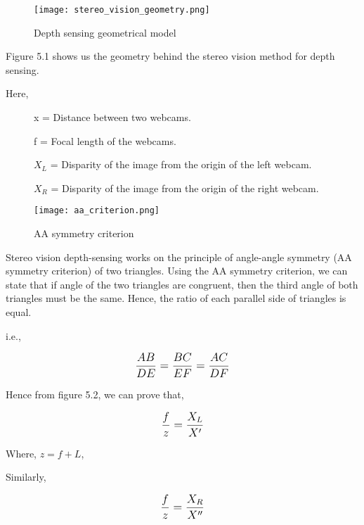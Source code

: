 \documentclass[../../hardware_design_intro/hardware_design_intro.tex]{subfiles}
\begin{document}
\FloatBarrier

\begin{figure}[ht]
    \centering
    \texttt{[image: stereo\_vision\_geometry.png]}
    \caption{Depth sensing geometrical model}
\end{figure}

\FloatBarrier

Figure 5.1 shows us the geometry behind the stereo vision method for depth sensing.

Here, 

\begin{description}
    \item[]x = Distance between two webcams. 
    \item[]f = Focal length of the webcams.
    \item[]\(X_{L}\) = Disparity of the image from the origin of the left webcam.
    \item[]\(X_{R}\) = Disparity of the image from the origin of the right webcam.  
\end{description}

\begin{figure}[ht]
    \centering
    \texttt{[image: aa\_criterion.png]}
    \caption{AA symmetry criterion}
\end{figure}

Stereo vision depth-sensing works on the principle of angle-angle symmetry (AA symmetry 
criterion) of two triangles. Using the AA symmetry criterion, we can state that if angle
of the two triangles are congruent, then the third angle of both triangles must be the 
same. Hence, the ratio of each parallel side of triangles is equal.

i.e.,

\begin{equation}
    \text{\large$ \frac{AB}{DE} = \frac{BC}{EF} = \frac{AC}{DF} $}
\end{equation}

Hence from figure 5.2, we can prove that,

\begin{equation}
    \text{\large$ \frac{f}{z} = \frac{X_{L}}{X'} $}
\end{equation}

Where, \(z = f + L \),

Similarly,

\begin{equation}
    \text{\large$ \frac{f}{z} = \frac{X_{R}}{X''} $}
\end{equation}
\end{document}
